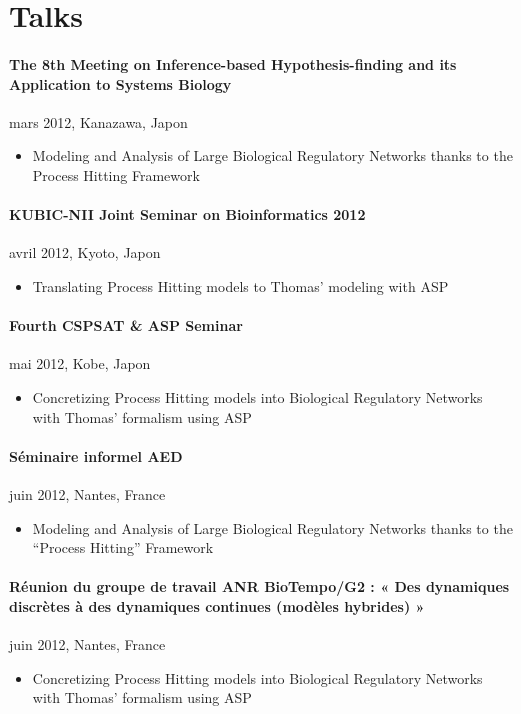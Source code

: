 \section{Talks}

\paragraph{The 8th Meeting on Inference-based Hypothesis-finding and its Application to Systems Biology}
mars 2012, Kanazawa, Japon
\begin{itemize}
\item[] Modeling and Analysis of Large Biological Regulatory Networks thanks to the Process Hitting Framework
\end{itemize}

\paragraph{KUBIC-NII Joint Seminar on Bioinformatics 2012}
avril 2012, Kyoto, Japon
\begin{itemize}
\item[] Translating Process Hitting models to Thomas' modeling with ASP
\end{itemize}

\paragraph{Fourth CSPSAT \& ASP Seminar}
mai 2012, Kobe, Japon
\begin{itemize}
\item[] Concretizing Process Hitting models into Biological Regulatory Networks with Thomas' formalism using ASP
\end{itemize}

\paragraph{Séminaire informel AED}
juin 2012, Nantes, France
\begin{itemize}
\item[] Modeling and Analysis of Large Biological Regulatory Networks thanks to the “Process Hitting” Framework
\end{itemize}

\paragraph{Réunion du groupe de travail ANR BioTempo/G2 : « Des dynamiques discrètes à des dynamiques continues (modèles hybrides) »}
juin 2012, Nantes, France
\begin{itemize}
\item[] Concretizing Process Hitting models into Biological Regulatory Networks with Thomas' formalism using ASP
\end{itemize}



